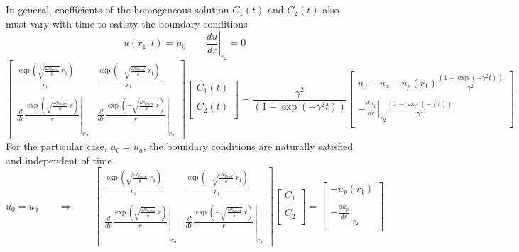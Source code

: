 \documentclass{article}         %
\theoremstyle{definition}
\theoremstyle{remark}
\begin{document}
In general,
coefficients of the homogeneous solution $C_1(t)$ and $C_2(t)$ also must vary with
time to satisty the boundary conditions
\[
 u(r_1,t) = u_0
  \qquad
 \left. \frac{d u}{dr} \right|_{r_2}  = 0
\]
\[
\begin{bmatrix}
    \frac{\exp\left( \sqrt{\frac{\omega c_\textit{blood}}{k}} \; r_1 \right)}{r_1}  
  & 
    \frac{\exp\left(-\sqrt{\frac{\omega c_\textit{blood}}{k}} \; r_1 \right)}{r_1}  
  \\
  \\
  \left.
   \frac{d}{dr}
    \frac{\exp\left( \sqrt{\frac{\omega c_\textit{blood}}{k}} \; r \right)}{r}  
  \right|_{r_2}
  & 
  \left.
   \frac{d}{dr}
    \frac{\exp\left(-\sqrt{\frac{\omega c_\textit{blood}}{k}} \; r \right)}{r}  
  \right|_{r_2}
\end{bmatrix}
\begin{bmatrix}
  C_1(t) \\
  \\
  C_2(t) \\
\end{bmatrix}
= 
 \frac{ \gamma^2}{\left( 1 - \exp(-\gamma^2 t)\right)}
\begin{bmatrix}
      u_0 - u_a - u_p(r_1)  
 \frac{\left( 1 - \exp(-\gamma^2 t)\right)}{ \gamma^2}  
   \\
   \\
  - \left. \frac{d u_p}{dr} 
  \right|_{r_2}
 \frac{\left( 1 - \exp(-\gamma^2 t)\right)}{ \gamma^2}  
\\
\end{bmatrix}
\]
For the particular case, $u_0=u_a$, the boundary conditions are naturally
satisfied and independent of time.
\[
u_0=u_a \qquad \Rightarrow \qquad
\begin{bmatrix}
    \frac{\exp\left( \sqrt{\frac{\omega c_\textit{blood}}{k}} \; r_1 \right)}{r_1}  
  & 
    \frac{\exp\left(-\sqrt{\frac{\omega c_\textit{blood}}{k}} \; r_1 \right)}{r_1}  
  \\
  \\
  \left.
   \frac{d}{dr}
    \frac{\exp\left( \sqrt{\frac{\omega c_\textit{blood}}{k}} \; r \right)}{r}  
  \right|_{r_2}
  & 
  \left.
   \frac{d}{dr}
    \frac{\exp\left(-\sqrt{\frac{\omega c_\textit{blood}}{k}} \; r \right)}{r}  
  \right|_{r_2}
\end{bmatrix}
\begin{bmatrix}
  C_1 \\
  \\
  C_2 \\
\end{bmatrix}
= 
\begin{bmatrix}
      - u_p(r_1)  
   \\
   \\
  - \left. \frac{d u_p}{dr} 
  \right|_{r_2}
\\
\end{bmatrix}
\]
\end{document}
